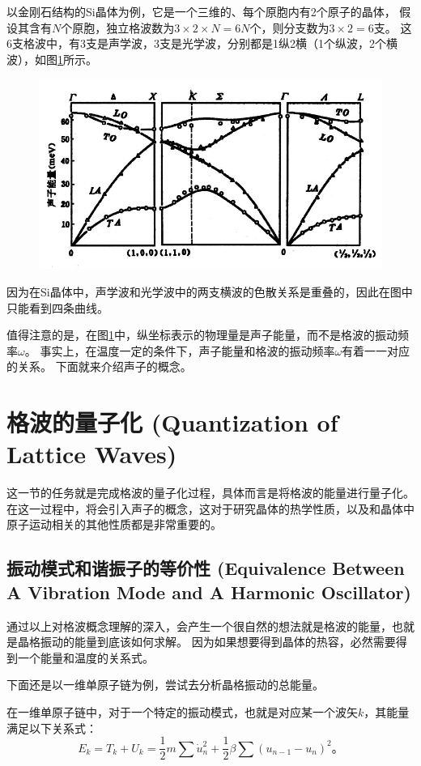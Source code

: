 \documentclass[declarePage]{ecnuthesis}
\begin{document}
以金刚石结构的Si晶体为例，它是一个三维的、每个原胞内有2个原子的晶体，%
假设其含有$N$个原胞，独立格波数为$3 \times 2  \times N= 6N$个，则分支数为$3 \times 2 = 6$支。%
这6支格波中，有3支是声学波，3支是光学波，分别都是1纵2横（1个纵波，2个横波），如图\ref{Si}所示。
\begin{figure}[htb]
    \centering
    \includegraphics[width=.7\textwidth]{Si.png}
     \label{Si}
\end{figure}

因为在Si晶体中，声学波和光学波中的两支横波的色散关系是重叠的，因此在图中只能看到四条曲线。

值得注意的是，在图\ref{Si}中，纵坐标表示的物理量是声子能量，而不是格波的振动频率$ω$。%
事实上，在温度一定的条件下，声子能量和格波的振动频率$ω$有着一一对应的关系。%
下面就来介绍声子的概念。

\section{格波的量子化 (Quantization of Lattice Waves)}

这一节的任务就是完成格波的量子化过程，具体而言是将格波的能量进行量子化。%
在这一过程中，将会引入声子的概念，这对于研究晶体的热学性质，以及和晶体中原子运动相关的其他性质都是非常重要的。

\subsection{振动模式和谐振子的等价性 (Equivalence Between A Vibration Mode and A Harmonic Oscillator)}

通过以上对格波概念理解的深入，会产生一个很自然的想法就是格波的能量，也就是晶格振动的能量到底该如何求解。%
因为如果想要得到晶体的热容，必然需要得到一个能量和温度的关系式。

下面还是以一维单原子链为例，尝试去分析晶格振动的总能量。%

在一维单原子链中，对于一个特定的振动模式，也就是对应某一个波矢$k$，其能量满足以下关系式：
\begin{equation}
    E_k=T_k+U_k=\frac{1}{2}m\sum\dot{u}_n^2+\frac{1}{2}\beta\sum(u_{n-1}-u_n)^2 \text{。}
\end{equation}
\end{document}
